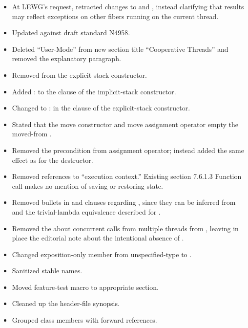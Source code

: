 \begin{itemize}
    \item At LEWG's request, retracted changes to 
          and , instead clarifying that results may
          reflect exceptions on other fibers running on the current thread.
    \item Updated against draft standard N4958.
    \item Deleted ``User-Mode'' from new section title ``Cooperative Threads''
          and removed the explanatory paragraph.
    \item Removed  from the explicit-stack constructor.
    \item Added : 
          to the \except clause of the implicit-stack constructor.
    \item Changed 
          to : 
          in the \except clause of the explicit-stack constructor.
    \item Stated that the move constructor and move assignment operator empty
          the moved-from \fiber.
    \item Removed the \emptyfn precondition from assignment operator; instead
          added the same  effect as for the destructor.
    \item Removed \resumewith references to ``execution context.'' Existing
          section 7.6.1.3 Function call  makes no mention
          of saving or restoring state.
    \item Removed bullets in \resumewith \returns and \except clauses
          regarding \resume, since they can be inferred from \resumewith and
          the trivial-lambda equivalence described for \resume.
    \item Removed the \remarks about concurrent calls from multiple threads
          from \canresume, leaving in place the editorial note about the
          intentional absence of .
    \item Changed exposition-only  member from unspecified-type
          to .
    \item Sanitized stable names.
    \item Moved feature-test macro to appropriate section.
    \item Cleaned up the header-file synopsis.
    \item Grouped class members with forward references.

\end{itemize}
